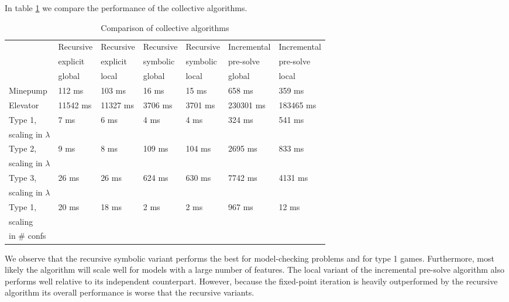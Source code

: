 In table \ref{tab_compare_collective_algs} we compare the performance of the collective algorithms.
\begin{table}[h]
	\centering
	\begin{tabular}{|l|l|l|l|l|l|l|}
		\hline
		& Recursive&Recursive &Recursive &Recursive & Incremental& Incremental\\
		& explicit &explicit & symbolic &symbolic & pre-solve &pre-solve\\
		& global & local &global  & local & global & local
		\\ \hline
		Minepump& 112 ms& 103 ms& 16 ms& 15 ms& 658 ms& 359 ms\\ \hline
		Elevator& 11542 ms& 11327 ms& 3706 ms& 3701 ms& 230301 ms& 183465 ms\\ \hline
		Type 1, & \multirow{2}{*}{7 ms}& \multirow{2}{*}{6 ms} & \multirow{2}{*}{4 ms} & \multirow{2}{*}{4 ms} & \multirow{2}{*}{324 ms} & \multirow{2}{*}{541 ms}\\
		scaling in $\lambda$& & & & & &\\ \hline
		Type 2,& \multirow{2}{*}{9 ms} & \multirow{2}{*}{8 ms} & \multirow{2}{*}{109 ms} & \multirow{2}{*}{104 ms} & \multirow{2}{*}{2695 ms} & \multirow{2}{*}{833 ms} \\
		scaling in $\lambda$& & & & & &\\ \hline
		Type 3,& \multirow{2}{*}{26 ms} & \multirow{2}{*}{26 ms} & \multirow{2}{*}{624 ms} & \multirow{2}{*}{630 ms} & \multirow{2}{*}{7742 ms} & \multirow{2}{*}{4131 ms}\\ 
		scaling in $\lambda$& & & & & &\\ \hline
		Type 1,& \multirow{3}{*}{20 ms} & \multirow{3}{*}{18 ms} & \multirow{3}{*}{2 ms} & \multirow{3}{*}{2 ms} & \multirow{3}{*}{967 ms} & \multirow{3}{*}{12 ms} \\
		scaling& & & & & &\\
		in \# confs& & & & & &\\ \hline
	\end{tabular}
	\caption{Comparison of collective algorithms}
	\label{tab_compare_collective_algs}
\end{table}
We observe that the recursive symbolic variant performs the best for model-checking problems and for type 1 games. Furthermore, most likely the algorithm will scale well for models with a large number of features. The local variant of the incremental pre-solve algorithm also performs well relative to its independent counterpart. However, because the fixed-point iteration is heavily outperformed by the recursive algorithm its overall performance is worse that the recursive variants.

